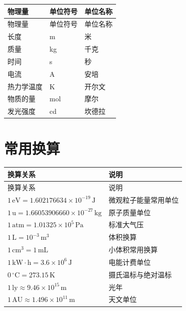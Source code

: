 \begin{longtable}{p{}p{}p{}}
\toprule
物理量 & 单位符号 & 单位名称 \\
\midrule
\endfirsthead

\toprule
物理量 & 单位符号 & 单位名称 \\
\midrule
\endhead

\bottomrule
\endfoot

长度 & m & 米 \\
质量 & kg & 千克 \\
时间 & s & 秒 \\
电流 & A & 安培 \\
热力学温度 & K & 开尔文 \\
物质的量 & mol & 摩尔 \\
发光强度 & cd & 坎德拉 \\
\end{longtable}

\section{常用换算}

\begin{longtable}{p{}p{}}
\toprule
换算关系 & 说明 \\
\midrule
\endfirsthead

\toprule
换算关系 & 说明 \\
\midrule
\endhead

\bottomrule
\endfoot

$1\,\text{eV}=1.602176634\times 10^{-19}\,\text{J}$ & 微观粒子能量常用单位 \\
$1\,\text{u}=1.66053906660\times 10^{-27}\,\text{kg}$ & 原子质量单位 \\
$1\,\text{atm}=1.01325\times 10^5\,\text{Pa}$ & 标准大气压 \\
$1\,\text{L}=10^{-3}\,\text{m}^3$ & 体积换算 \\
$1\,\text{cm}^3=1\,\text{mL}$ & 小体积常用换算 \\
$1\,\text{kW}\cdot\text{h}=3.6\times 10^6\,\text{J}$ & 电能计费单位 \\
$0\,^{\circ}\text{C}=273.15\,\text{K}$ & 摄氏温标与绝对温标 \\
$1\,\text{ly}\approx 9.46\times 10^{15}\,\text{m}$ & 光年 \\
$1\,\text{AU}\approx 1.496\times 10^{11}\,\text{m}$ & 天文单位 \\
\end{longtable}

